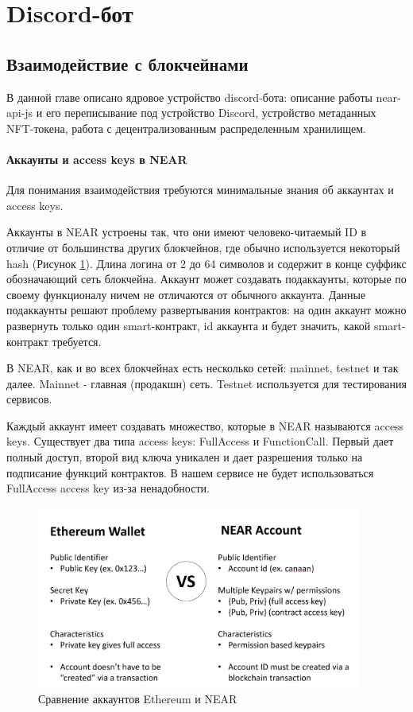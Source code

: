 \section{Discord-бот}
\label{section.main.bot}

\subsection{Взаимодействие с блокчейнами}

В данной главе описано ядровое устройство discord-бота: описание работы near-api-js и его переписывание под устройство Discord, устройство метаданных NFT-токена, работа с децентрализованным распределенным хранилищем.

\paragraph{Аккаунты и access keys в NEAR}
Для понимания взаимодействия требуются минимальные знания об аккаунтах и access keys.

Аккаунты в NEAR\cite{nearaccounts} устроены так, что они имеют человеко-читаемый ID в отличие от большинства других блокчейнов, где обычно используется некоторый hash (Рисунок {\color{blue} \ref{fig.eth_near_cmp}}). Длина логина от 2 до 64 символов и содержит в конце суффикс обозначающий сеть блокчейна. Аккаунт может создавать подаккаунты, которые по своему функционалу ничем не отличаются от обычного аккаунта. Данные подаккаунты решают проблему развертывания контрактов: на один аккаунт можно развернуть только один smart-контракт, id аккаунта и будет значить, какой smart-контракт требуется.

\begin{definition}
    В NEAR, как и во всех блокчейнах есть несколько сетей: mainnet, testnet и так далее. Mainnet - главная (продакшн) сеть. Testnet используется для тестирования сервисов.
\end{definition}

Каждый аккаунт имеет создавать множество, которые в NEAR называются access keys. Существует два типа access keys: FullAccess и FunctionCall. Первый дает полный доступ, второй вид ключа уникален и дает разрешения только на подписание функций контрактов. В нашем сервисе не будет использоваться FullAccess access key из-за ненадобности.

\begin{figure}
    \centering
    \includegraphics[height=60mm]{fig/eth_near_cmp.png}
    \caption{Сравнение аккаунтов Ethereum и NEAR}
    \label{fig.eth_near_cmp}
\end{figure}

